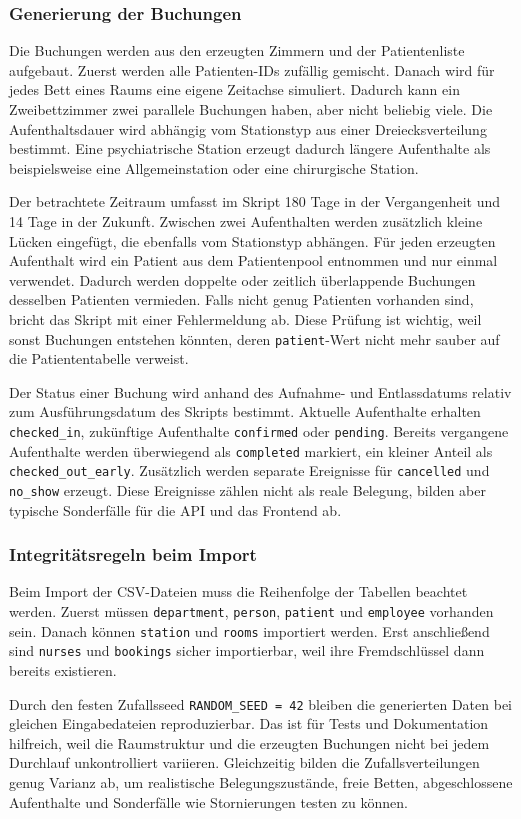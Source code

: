 \subsubsection*{Generierung der Buchungen}

Die Buchungen werden aus den erzeugten Zimmern und der Patientenliste aufgebaut. Zuerst werden alle
Patienten-IDs zufällig gemischt. Danach wird für jedes Bett eines Raums eine eigene Zeitachse
simuliert. Dadurch kann ein Zweibettzimmer zwei parallele Buchungen haben, aber nicht beliebig viele.
Die Aufenthaltsdauer wird abhängig vom Stationstyp aus einer Dreiecksverteilung bestimmt. Eine
psychiatrische Station erzeugt dadurch längere Aufenthalte als beispielsweise eine Allgemeinstation
oder eine chirurgische Station.

Der betrachtete Zeitraum umfasst im Skript 180 Tage in der Vergangenheit und 14 Tage in der Zukunft.
Zwischen zwei Aufenthalten werden zusätzlich kleine Lücken eingefügt, die ebenfalls vom Stationstyp
abhängen. Für jeden erzeugten Aufenthalt wird ein Patient aus dem Patientenpool entnommen und nur
einmal verwendet. Dadurch werden doppelte oder zeitlich überlappende Buchungen desselben Patienten
vermieden. Falls nicht genug Patienten vorhanden sind, bricht das Skript mit einer Fehlermeldung ab.
Diese Prüfung ist wichtig, weil sonst Buchungen entstehen könnten, deren \texttt{patient}-Wert nicht
mehr sauber auf die Patiententabelle verweist.

Der Status einer Buchung wird anhand des Aufnahme- und Entlassdatums relativ zum Ausführungsdatum
des Skripts bestimmt. Aktuelle Aufenthalte erhalten \texttt{checked\_in}, zukünftige Aufenthalte
\texttt{confirmed} oder \texttt{pending}. Bereits vergangene Aufenthalte werden überwiegend als
\texttt{completed} markiert, ein kleiner Anteil als \texttt{checked\_out\_early}. Zusätzlich werden
separate Ereignisse für \texttt{cancelled} und \texttt{no\_show} erzeugt. Diese Ereignisse zählen
nicht als reale Belegung, bilden aber typische Sonderfälle für die API und das Frontend ab.

\subsubsection*{Integritätsregeln beim Import}

Beim Import der CSV-Dateien muss die Reihenfolge der Tabellen beachtet werden. Zuerst müssen
\texttt{department}, \texttt{person}, \texttt{patient} und \texttt{employee} vorhanden sein. Danach
können \texttt{station} und \texttt{rooms} importiert werden. Erst anschließend sind
\texttt{nurses} und \texttt{bookings} sicher importierbar, weil ihre Fremdschlüssel dann bereits
existieren.

Durch den festen Zufallsseed \texttt{RANDOM\_SEED = 42} bleiben die generierten Daten bei gleichen
Eingabedateien reproduzierbar. Das ist für Tests und Dokumentation hilfreich, weil die Raumstruktur
und die erzeugten Buchungen nicht bei jedem Durchlauf unkontrolliert variieren. Gleichzeitig bilden
die Zufallsverteilungen genug Varianz ab, um realistische Belegungszustände, freie Betten,
abgeschlossene Aufenthalte und Sonderfälle wie Stornierungen testen zu können.
